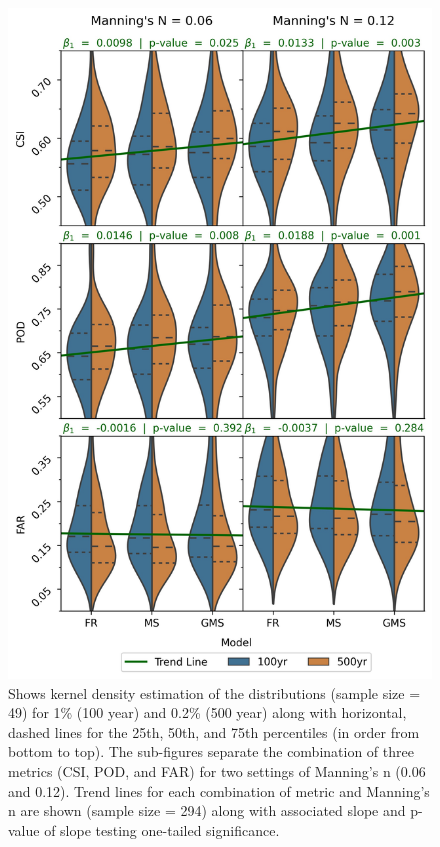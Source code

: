 \documentclass[draft]{dependencies/agujournal2019}
\begin{document}
\begin{figure}[H]
\centering
\includegraphics[scale=0.8]{figures/violin_plots.jpg}
\caption{Shows kernel density estimation of the distributions (sample size = 49) for 1\% (100 year) and 0.2\% (500 year) along with horizontal, dashed lines for the 25th, 50th, and 75th percentiles (in order from bottom to top).
The sub-figures separate the combination of three metrics (CSI, POD, and FAR) for two settings of Manning's n (0.06 and 0.12).
Trend lines for each combination of metric and Manning's n are shown (sample size = 294) along with associated slope and p-value of slope testing one-tailed significance.}
\label{fig:violin_plot}
\end{figure}
\end{document}

